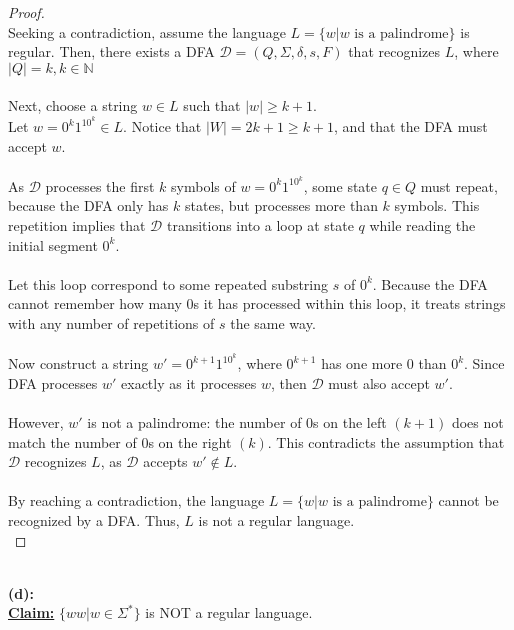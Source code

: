\documentclass[12pt]{article}
\begin{document}
\begin{proof}
\leavevmode\\
    Seeking a contradiction, assume the language $L = \{ w | w \text{ is a palindrome} \}$ is regular. Then, there exists a DFA $\mathcal{D} = (Q, \Sigma, \delta, s, F)$ that recognizes $L$, where $|Q| = k, k \in \mathbb{N}$ \\
    \\
    Next, choose a string $w \in L$ such that $|w| \geq k + 1$. \\
    Let $w = 0^k1^10^k \in L$. Notice that $|W| = 2k + 1 \geq k + 1$, and that the DFA must accept $w$. \\
    \\
    As $\mathcal{D}$ processes the first $k$ symbols of $w = 0^k1^10^k$, some state $q \in Q$ must repeat, because the DFA only has $k$ states, but processes more than $k$ symbols. This repetition implies that $\mathcal{D}$ transitions into a loop at state $q$ while reading the initial segment $0^k$. \\
    \\
    Let this loop correspond to some repeated substring $s$ of $0^k$. Because the DFA cannot remember how many $0$s it has processed within this loop, it treats strings with any number of repetitions of $s$ the same way. \\
    \\
    Now construct a string $w' = 0^{k + 1}1^10^k$, where $0^{k + 1}$ has one more $0$ than $0^k$. Since DFA processes $w'$ exactly as it processes $w$, then $\mathcal{D}$ must also accept $w'$. \\
    \\
    However, $w'$ is not a palindrome: the number of $0$s on the left $(k + 1)$ does not match the number of $0$s on the right $(k)$. This contradicts the assumption that $\mathcal{D}$ recognizes $L$, as $\mathcal{D}$ accepts $w' \notin L$. \\
    \\
    By reaching a contradiction, the language $L = \{ w | w \text{ is a palindrome} \}$ cannot be recognized by a DFA. Thus, $L$ is not a regular language. \\
\end{proof}
\leavevmode\\
\textbf{(d):} \\
\textbf{\underline{Claim:}} $\{ ww | w \in \Sigma^* \}$ is NOT a regular language.
\end{document}
